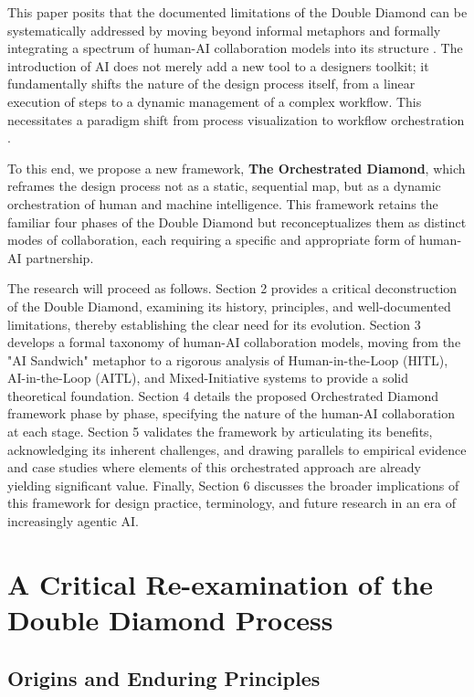 \documentclass[
  12pt,
  a4paper,
  bibliography=totoc,
  numbers=noenddot
]{scrartcl}
\begin{document}
This paper posits that the documented limitations of the Double Diamond
can be systematically addressed by moving beyond informal metaphors and
formally integrating a spectrum of human-AI collaboration models into
its structure \cite{arxiv2025human}. The introduction of AI does not merely add a new tool to
a designer\textquotesingle s toolkit; it fundamentally shifts the nature
of the design process itself, from a linear execution of steps to a
dynamic management of a complex workflow. This necessitates a paradigm
shift from process visualization to workflow
orchestration \cite{ibm2025orchestration}.

To this end, we propose a new framework, \textbf{The Orchestrated
Diamond}, which reframes the design process not as a static, sequential
map, but as a dynamic orchestration of human and machine intelligence.
This framework retains the familiar four phases of the Double Diamond
but reconceptualizes them as distinct modes of collaboration, each
requiring a specific and appropriate form of human-AI partnership.

The research will proceed as follows. Section 2 provides a critical
deconstruction of the Double Diamond, examining its history, principles,
and well-documented limitations, thereby establishing the clear need for
its evolution. Section 3 develops a formal taxonomy of human-AI
collaboration models, moving from the "AI Sandwich" metaphor to a
rigorous analysis of Human-in-the-Loop (HITL), AI-in-the-Loop (AITL),
and Mixed-Initiative systems to provide a solid theoretical foundation.
Section 4 details the proposed Orchestrated Diamond framework phase by
phase, specifying the nature of the human-AI collaboration at each
stage. Section 5 validates the framework by articulating its benefits,
acknowledging its inherent challenges, and drawing parallels to
empirical evidence and case studies where elements of this orchestrated
approach are already yielding significant value. Finally, Section 6
discusses the broader implications of this framework for design
practice, terminology, and future research in an era of increasingly
agentic AI.

\section{A Critical Re-examination
of the Double Diamond
Process}\label{section-2-a-critical-re-examination-of-the-double-diamond-process}

\subsection{Origins and Enduring
Principles}\label{origins-and-enduring-principles}
\end{document}
